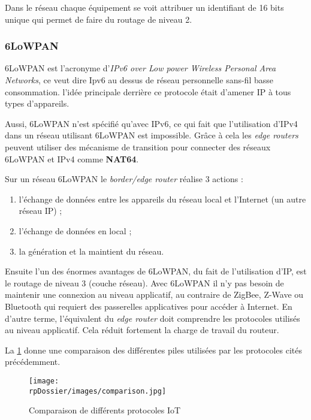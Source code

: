 Dans le réseau chaque équipement se voit attribuer un identifiant de 16 bits unique qui permet de faire du routage de niveau 2.

\subsubsection{6LoWPAN}

6LoWPAN est l'acronyme d'\textit{IPv6 over Low power Wireless Personal Area Networks}, ce veut dire Ipv6 au dessus de réseau personnelle sans-fil basse consommation. l'idée principale derrière ce protocole était d'amener IP à tous types d'appareils. 

Aussi, 6LoWPAN n'est spécifié qu'avec IPv6, ce qui fait que l'utilisation d'IPv4 dans un réseau utilisant 6LoWPAN est impossible. Grâce à cela les \textit{edge routers} peuvent utiliser des mécanisme de transition pour connecter des réseaux 6LoWPAN et IPv4 comme \textbf{NAT64}.

Sur un réseau 6LoWPAN le \textit{border/edge router} réalise 3 actions :
\begin{enumerate}
	\item l'échange de données entre les appareils du réseau local et l'Internet (un autre réseau IP) ;
	\item l'échange de données en local ;
	\item la génération et la maintient du réseau.
\end{enumerate}

Ensuite l'un des énormes avantages de 6LoWPAN, du fait de l'utilisation d'IP, est le routage de niveau 3 (couche réseau). Avec 6LoWPAN il n'y pas besoin de maintenir une connexion au niveau applicatif, au contraire de ZigBee, Z-Wave ou Bluetooth qui requiert des passerelles applicatives pour accéder à Internet. En d'autre terme, l'équivalent du \textit{edge router} doit comprendre les protocoles utilisés au niveau applicatif. Cela réduit fortement la charge de travail du routeur.

La \cref{comparison} donne une comparaison des différentes piles utilisées par les protocoles cités précédemment.

\begin{figure}[H]
\centering
\texttt{[image: \\rpDossier/images/comparison.jpg]}
\caption{Comparaison de différents protocoles IoT}
\label{comparison}
\end{figure}


